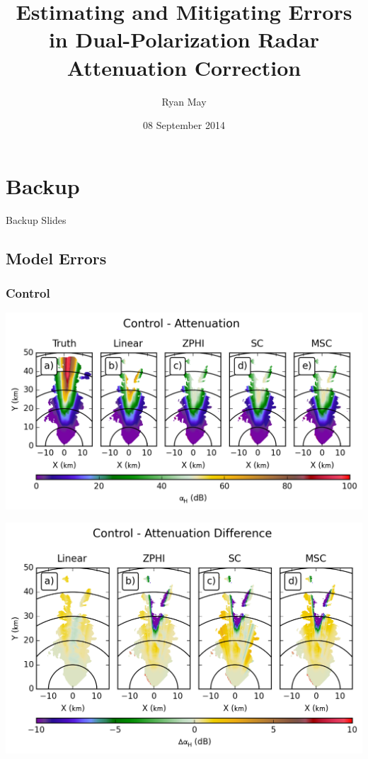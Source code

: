 \documentclass[red]{beamer}
\title{Estimating and Mitigating Errors in Dual-Polarization Radar Attenuation Correction}
\author{Ryan May}
\date{08 September 2014}
\begin{document}
\section{Backup}
\begin{frame}
	\begin{center}
		Backup Slides
	\end{center}
\end{frame}

\subsection{Model Errors}
\subsubsection{Control}
\begin{frame}
    \begin{center}
        \includegraphics[scale=0.7]{figures/X_Control_Attenuation_H}
    \end{center}
\end{frame}

\begin{frame}
    \begin{center}
        \includegraphics[scale=0.7]{figures/X_Control_Attenuation_Difference_H}
    \end{center}
\end{frame}
\end{document}
